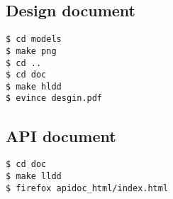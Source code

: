 \subsection{Design document} 

\begin{lstlisting}[style=console]
$ cd models
$ make png
$ cd ..
$ cd doc
$ make hldd
$ evince desgin.pdf
\end{lstlisting}

\subsection{API document} 

\begin{lstlisting}[style=console]
$ cd doc
$ make lldd
$ firefox apidoc_html/index.html
\end{lstlisting}


